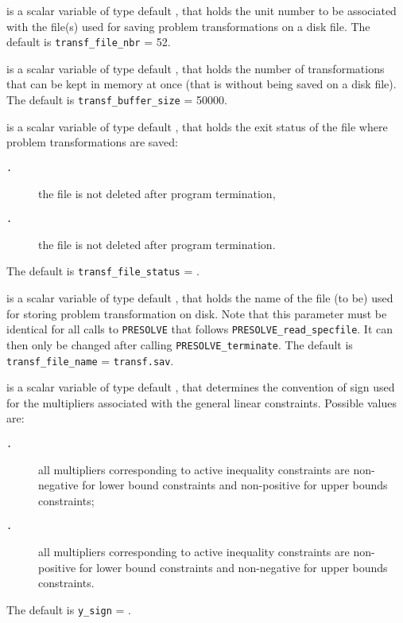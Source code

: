 \documentclass{galahad}
\newcommand{\packagename}{PRESOLVE}
\newcommand{\sym}{\tt\small}
\begin{document}
\begin{description}
 is a scalar variable of type default \integer, that
holds the unit number to be associated with the file(s) used
for saving problem transformations on a disk file.
The default is {\tt transf\_file\_nbr} = 52.

 is a scalar variable of type default \integer, that
holds the number of transformations that can be kept in memory
at once (that is without being saved on a disk file).
The default is {\tt transf\_buffer\_size} = 50000.

 is a scalar variable of type default \integer, that
holds the exit status of the file where problem transformations are saved:
\begin{description}
\item[\sym \galsymkeep.] the file is not deleted after program termination,
\item[\sym \galsymdelete.] the file is not deleted after program termination.
\end{description}
The default is {\tt transf\_file\_status} = {\sym \galsymkeep}.

 is a scalar variable of type default \integer, that
holds the name of the file (to be) used for storing problem transformation on
disk. Note that this parameter must be identical for all calls to 
{\tt \packagename} that follows {\tt \packagename\_read\_specfile}. It can
then only be changed after calling {\tt \packagename\_terminate}.
The default is {\tt transf\_file\_name} = {\tt transf.sav}.

 is a scalar variable of type default \integer, that
determines the convention of sign used for the multipliers
associated with the general linear constraints. Possible values are:
\begin{description}
\item[\sym \galsympositive.] all multipliers corresponding to active 
                inequality constraints are non-negative for 
                lower bound constraints and non-positive for 
                upper bounds constraints;
\item[\sym \galsymnegative.] all multipliers corresponding to active 
                inequality constraints are non-positive for 
                lower bound constraints and non-negative for 
                upper bounds constraints.
\end{description}
The default is {\tt y\_sign} = {\sym \galsympositive}.


\end{description}
\end{document}
